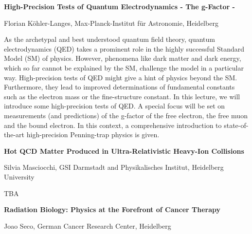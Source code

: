 \par
\newpage

\begin{center}
{{\large\bfseries High-Precision Tests of Quantum Electrodynamics - The g-Factor -}\par} \medskip

{\large Florian Köhler-Langes, Max-Planck-Institut für Astronomie, Heidelberg\par}
\end{center}

As the archetypal and best understood quantum field theory, quantum electrodynamics (QED) takes a prominent role in the highly successful Standard Model (SM) of physics. However, phenomena like dark matter and dark energy, which so far cannot be explained by the SM, challenge the model in a particular way. High-precision tests of QED might give a hint of physics beyond the SM. Furthermore, they lead to improved determinations of fundamental constants such as the electron mass or the fine-structure constant. In this lecture, we will introduce some high-precision tests of QED. A special focus will be set on measurements (and predictions) of the g-factor of the free electron, the free muon and the bound electron. In this context, a comprehensive introduction to state-of-the-art high-precision Penning-trap physics is given.\par
\newpage

\begin{center}
{{\large\bfseries Hot QCD Matter Produced in Ultra-Relativistic Heavy-Ion Collisions}\par} \medskip

{\large Silvia Masciocchi, GSI Darmstadt and Physikalisches Institut, Heidelberg University\par}
\end{center}

TBA

\noindent 
\par
\newpage

\begin{center}
{{\large\bfseries Radiation Biology: Physics at the Forefront of Cancer Therapy}\par} \medskip

{\large Joao Seco, German Cancer Research Center, Heidelberg\par}
\end{center}


